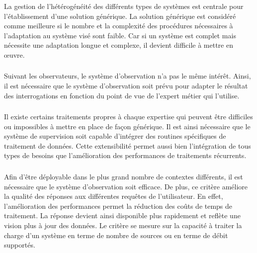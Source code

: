 \subsubsection{\critereCA}\label{sec:rw:supervision:criteres:adaptation}
La gestion de l'hétérogénéité des différents types de systèmes est centrale pour l'établissement d'une solution générique. La solution générique est considéré comme meilleure si le nombre et la complexité des procédures nécessaires à l'adaptation au système visé sont faible. Car si un système est complet mais nécessite une adaptation longue et complexe, il devient difficile à mettre en œuvre.

\subsubsection{\critereCB}
Suivant les observateurs, le système d'observation n'a pas le même intérêt. Ainsi, il est nécessaire que le système d'observation soit prévu pour adapter le résultat des interrogations en fonction du point de vue de l'expert métier qui l'utilise.

\subsubsection{\critereCC}
Il existe certains traitements propres à chaque expertise qui peuvent être difficiles ou impossibles à mettre en place de façon générique. Il est ainsi nécessaire que le système de supervision soit capable d'intégrer des routines spécifiques de traitement de données. Cette extensibilité permet aussi bien l'intégration de tous types de besoins que l'amélioration des performances de traitements récurrents.

\subsubsection{\critereCD}
Afin d'être déployable dans le plus grand nombre de contextes différents, il est nécessaire que le système d'observation soit efficace. De plus, ce critère améliore la qualité des réponses aux différentes requêtes de l'utilisateur. En effet, l'amélioration des performances permet la réduction des coûts de temps de traitement. La réponse devient ainsi disponible plus rapidement et reflète une vision plus à jour des données. Le critère se mesure sur la capacité à traiter la charge d'un système en terme de nombre de sources ou en terme de débit supportés.
